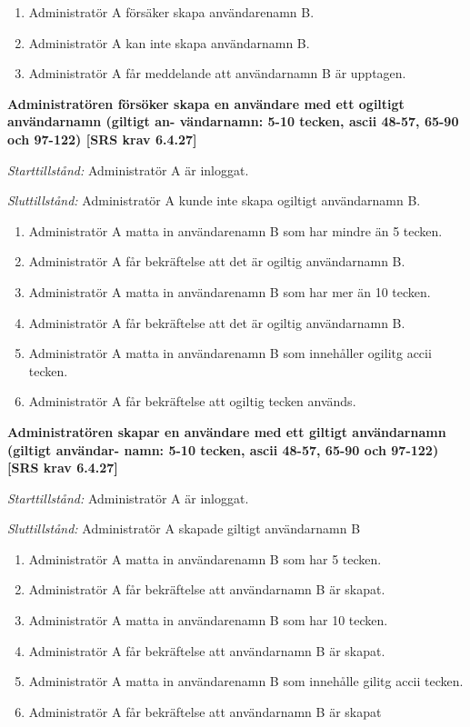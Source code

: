 \documentclass[a4paper]{article}
\begin{document}
\begin{FT}
\begin{enumerate}
\item Administratör A försäker skapa användarenamn B.
\item Administratör A kan inte  skapa användarnamn B. 
\item Administratör A får meddelande att användarnamn B är upptagen.
\end{enumerate}

\item %
\textbf{Administratören försöker skapa en användare med ett ogiltigt användarnamn (giltigt an- vändarnamn: 5-10 tecken, ascii 48-57, 65-90 och 97-122) [SRS krav 6.4.27]} 

\emph{Starttillstånd:} Administratör A är inloggat.

\emph{Sluttillstånd:} Administratör A kunde inte skapa ogiltigt användarnamn B.

\begin{enumerate}
\item Administratör A matta in användarenamn B som har mindre än 5 tecken.
\item Administratör A får bekräftelse att det är ogiltig användarnamn B.
\item Administratör A matta in användarenamn B som har mer än 10 tecken.
\item Administratör A får bekräftelse att det är ogiltig användarnamn B.
\item Administratör A matta in användarenamn B som innehåller ogilitg accii tecken.
\item Administratör A får bekräftelse att ogiltig tecken används.
\end{enumerate}

\item %
\textbf{Administratören skapar en användare med ett giltigt användarnamn (giltigt användar- namn: 5-10 tecken, ascii 48-57, 65-90 och 97-122) [SRS krav 6.4.27]}

\emph{Starttillstånd:} Administratör A är inloggat.

\emph{Sluttillstånd:} Administratör A skapade  giltigt användarnamn B

\begin{enumerate}
\item Administratör A matta in användarenamn B som har 5 tecken.
\item Administratör A får bekräftelse att användarnamn B är skapat.
\item Administratör A matta in användarenamn B som har 10 tecken.
\item Administratör A får bekräftelse att användarnamn B är skapat.
\item Administratör A matta in användarenamn B som innehålle gilitg accii tecken.
\item Administratör A får bekräftelse att användarnamn B är skapat
\end{enumerate}


\end{FT}
\end{document}
